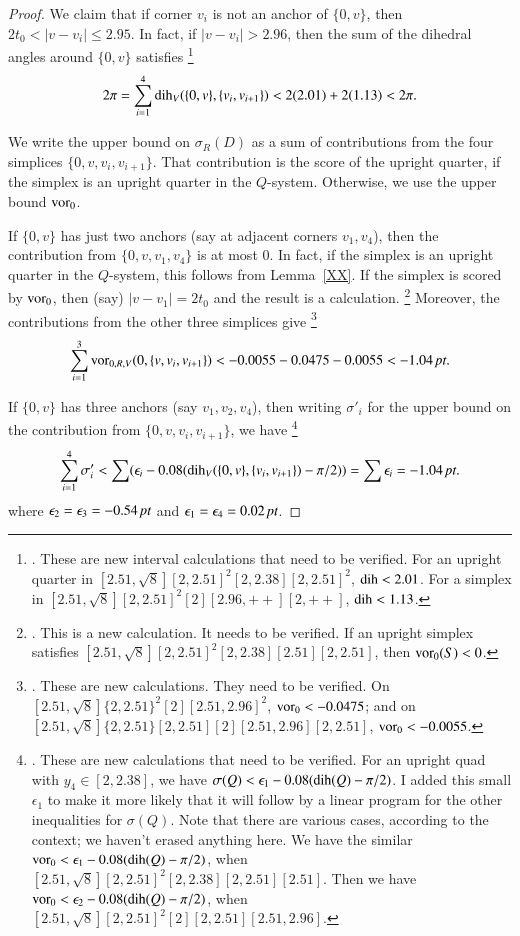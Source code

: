 \begin{proof}
We claim that if corner $v_i$ is not an anchor of $\{0,v\}$,
then $2t_0 < |v-v_i| \le 2.95$.  In fact, if $|v-v_i| > 2.96$,
then the sum of the dihedral angles around $\{0,v\}$ satisfies%
\footnote{.  These are new interval calculations 
  that need to be verified.  For an upright quarter in
  $[2.51,\sqrt8][2,2.51]^2[2,2.38][2,2.51]^2$, $\operatorname{dih} < 2.01$.
For a simplex in $[2.51,\sqrt8][2,2.51]^2 [2] [2.96,++][2,++]$,
$\operatorname{dih} < 1.13$.}
 $$
 2\pi = \sum_{i=1}^4 \operatorname{dih}_V(\{0,v\},\{v_i,v_{i+1}\}) < 2(2.01)+2(1.13) < 2\pi.
 $$

We write the upper bound on $\sigma_R(D)$ 
as a sum of contributions from the four simplices
$\{0,v,v_i,v_{i+1}\}$.    That contribution is the score of the
upright quarter, if the simplex is an upright quarter in the $Q$-system.
Otherwise, we use the upper bound $\operatorname{vor}_0$.

If $\{0,v\}$ has just two anchors (say at adjacent corners $v_1,v_4$),
then the contribution from $\{0,v,v_1,v_4\}$ is at most $0$.  In
fact, if the simplex is an upright quarter in the $Q$-system, this
follows from Lemma~\ref{XX}.  If the simplex is scored by $\operatorname{vor}_0$,
then (say) $|v-v_1|=2t_0$ and the result is a calculation.%
\footnote{.  This is a new calculation.  
It needs to be verified.  If an upright
simplex satisfies $[2.51,\sqrt8][2,2.51]^2[2,2.38][2.51][2,2.51]$,
then $\operatorname{vor}_0(S) < 0$.}  Moreover, the contributions from the other
three simplices give%
\footnote{. These are new calculations.  They need
to be verified.  On
$[2.51,\sqrt8]\{2,2.51\}^2[2][2.51,2.96]^2$, $\operatorname{vor}_0 < -0.0475$; and
on $[2.51,\sqrt8]\{2,2.51\}[2,2.51][2][2.51,2.96][2,2.51]$,
   $\operatorname{vor}_0 < -0.0055$.
}
 $$\sum_{i=1}^3\operatorname{vor}_{0,R,V}(0,\{v,v_i,v_{i+1}\}) <
   -0.0055 - 0.0475 - 0.0055 < -1.04\,\hbox{\it pt}.$$

If $\{0,v\}$ has three anchors (say $v_1,v_2,v_4$), then
writing $\sigma'_i$ for the upper bound on the contribution
from $\{0,v,v_i,v_{i+1}\}$, we have%
\footnote{.  These are new calculations that need to
be verified.  For an upright quad with $y_4\in[2,2.38]$, we
have $\sigma(Q) < \epsilon_1 -0.08(\operatorname{dih}(Q)-\pi/2)$.  I added
this small $\epsilon_1$ to make it more likely that it will follow
by a linear program for the other inequalities for $\sigma(Q)$.
Note that there are various cases, according to the context; we
haven't erased anything here.  We have the similar
  $\operatorname{vor}_0 < \epsilon_1 -0.08(\operatorname{dih}(Q)-\pi/2)$,
when $[2.51,\sqrt8][2,2.51]^2[2,2.38][2,2.51][2.51]$.  Then we
have $\operatorname{vor}_0 < \epsilon_2  -0.08(\operatorname{dih}(Q)-\pi/2)$,
when $[2.51,\sqrt8][2,2.51]^2[2][2,2.51][2.51,2.96]$.
}
  $$
  \sum_{i=1}^4\sigma'_i < 
  \sum (\epsilon_i -0.08 (\operatorname{dih}_V(\{0,v\},\{v_i,v_{i+1}\})-\pi/2))
  = \sum\epsilon_i = -1.04\,\hbox{\it pt}.
  $$
where $\epsilon_2=\epsilon_3 = -0.54\,\hbox{\it pt}$ and $\epsilon_1=\epsilon_4 =
0.02\,\hbox{\it pt}$.
\end{proof}

